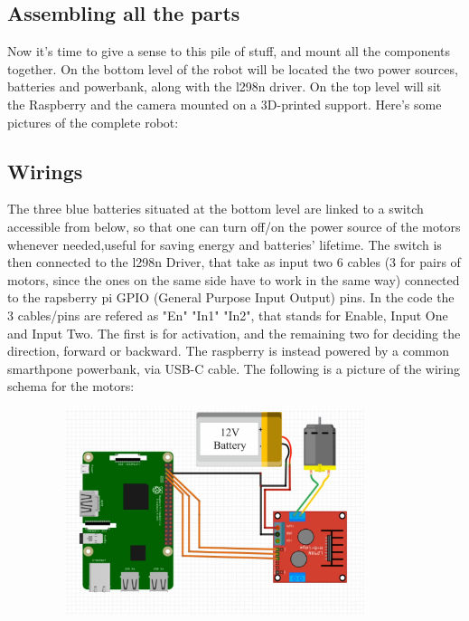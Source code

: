 \documentclass[12pt,a4paper]{article}
\begin{document}
\begin{large}
\subsection{Assembling all the parts}
Now it's time to give a sense to this pile of stuff, and mount all the components together. On the bottom level of the robot will be located the two power sources, batteries and powerbank, along with the l298n driver. On the top level will sit the Raspberry and the camera mounted on a 3D-printed support. Here's some pictures of the complete robot:
\begin{figure}[hb]
\centering
\begin{subfigure}{0.32\textwidth}
  \centering
  \label{fig:right}
  \end{subfigure}
\begin{subfigure}{0.32\textwidth}
  \centering
  \label{fig:right}
  \end{subfigure}
\begin{subfigure}{0.32\textwidth}
  \centering
  \label{fig:right}
  \end{subfigure}
\end{figure}

\subsection{Wirings}

The three blue batteries situated at the bottom level are linked to a switch accessible from below, so that one can turn off/on the power source of the motors whenever needed,useful for saving energy and batteries' lifetime.
The switch is then connected to the l298n Driver, that take as input two 6 cables (3 for pairs of motors, since the ones on the same side have to work in the same way) connected to the rapsberry pi GPIO (General Purpose Input Output) pins.
In the code the 3 cables/pins are refered as "En" "In1" "In2", that stands for Enable, Input One and Input Two. The first is for activation, and the remaining two for deciding the direction, forward or backward.
The raspberry is instead powered by a common smarthpone powerbank, via USB-C cable.
The following is a picture of the wiring schema for the motors: 
\begin{figure}[h!]
  \centering
  \includegraphics[width = 10cm,height=6cm]{images/schema.jpg}
  \label{fig:schema}
\end{figure}


\end{large}
\end{document}
